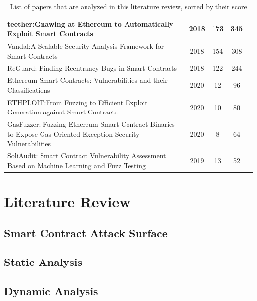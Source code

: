 \documentclass[a4paper,11pt]{article}
\begin{document}
\begin{table}[htpb]
\begin{center}
\begin{tabular}{||p{11cm}|c|c|c|c||}
                teether:Gnawing at Ethereum to Automatically Exploit Smart Contracts & 2018  & 173 & 345 & \cite{krupp2018teether} \\
                \hline
                Vandal:A Scalable Security Analysis Framework for Smart Contracts & 2018  & 154 & 308 & \cite{brent2018vandal} \\
                \hline
                ReGuard: Finding Reentrancy Bugs in Smart Contracts & 2018  & 122 & 244 & \cite{liu2018reguard} \\
                \hline
                Ethereum Smart Contracts: Vulnerabilities and their Classifications & 2020  & 12 & 96 & \cite{khan2020ethereum} \\
                \hline
                ETHPLOIT:From Fuzzing to Efficient Exploit Generation against Smart Contracts & 2020  & 10 & 80 & \cite{zhang2020ethploit} \\
                \hline
                GasFuzzer: Fuzzing Ethereum Smart Contract Binaries to Expose Gas-Oriented Exception Security Vulnerabilities & 2020  & 8 & 64 & \cite{ashraf2020gasfuzzer} \\
                \hline
                SoliAudit: Smart Contract Vulnerability Assessment Based on Machine Learning and Fuzz Testing & 2019  & 13 & 52 & \cite{liao2019soliaudit} \\
                \hline
            \end{tabular}
            \label{table:studies}
            \caption{List of papers that are analyzed in this literature review, sorted by their score}
        \end{center}
\end{table}

\pagebreak

\section{Literature Review}

\subsection{Smart Contract Attack Surface}

\subsection{Static Analysis}

\subsection{Dynamic Analysis}
\end{document}
